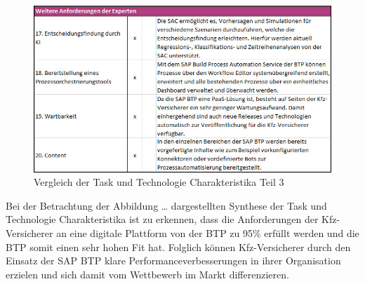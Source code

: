 \FloatBarrier

\begin{figure}[ht]
    \centering
    \includegraphics[width=1\textwidth]{img/TTFTeil3S.jpg}
    \caption[Vergleich der Task und Technologie Charakteristika Teil 3]{Vergleich der Task und Technologie Charakteristika Teil 3\autocite{TFTeil3}}
    \label{fig:TTFTeil3}
\end{figure}

\FloatBarrier

Bei der Betrachtung der Abbildung … dargestellten Synthese der Task und Technologie Charakteristika ist zu erkennen, dass die Anforderungen der Kfz-Versicherer an eine digitale Plattform von der BTP zu 95\% erfüllt werden und die BTP somit einen sehr hohen Fit hat. Folglich können Kfz-Versicherer durch den Einsatz der SAP BTP klare Performanceverbesserungen in ihrer Organisation erzielen und sich damit vom Wettbewerb im Markt differenzieren.



\newpage